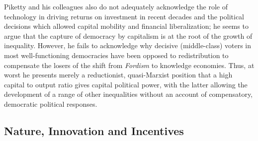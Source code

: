 \documentclass[12pt]{article}
\newcommand{\1}{\mathbbm 1}
\begin{document}
		Piketty and his colleagues also do not adequately acknowledge the role of technology in driving returns on investment in recent decades and the political decisions which allowed capital mobility and financial liberalization; he seems to argue that the capture of democracy by capitalism is at the root of the growth of inequality. However, he fails to acknowledge why decisive (middle-class) voters in most well-functioning democracies have been opposed to redistribution to compensate the losers of the shift from \textit{Fordism} to knowledge economies. Thus, at worst he presents merely a reductionist, quasi-Marxist position that a high capital to output ratio gives capital political power, with the latter allowing the development of a range of other inequalities without an account of compensatory, democratic political responses.
		
		
		
		
		
		
		
		
		
		
		
		
	
		
		\subsection{Nature, Innovation and Incentives}
		
\end{document}
